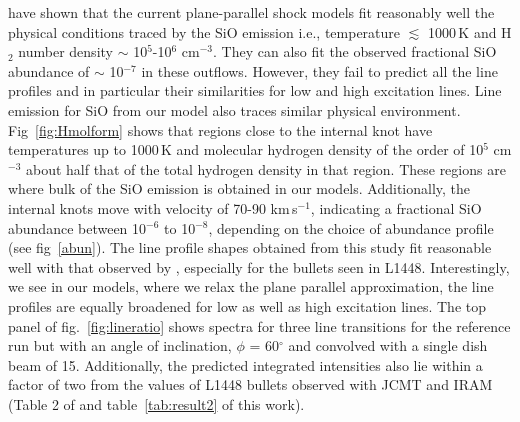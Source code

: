 \documentclass[useAMS,usenatbib,letters]{mn2e}
\begin{document}
\cite{Nisini:2007p13128} have shown that the current
plane-parallel shock models fit reasonably well the physical
conditions traced by the SiO emission i.e., temperature $\lesssim$
1000\,K and H$_{2}$ number density $\sim$ 10$^{5}$-10$^{6}$
cm$^{-3}$. They can also fit the observed fractional SiO abundance of
$\sim$ 10$^{-7}$ in these outflows. However, they fail to predict all
the line profiles and in particular their similarities for low and
high excitation lines. Line emission for SiO from our model also traces similar
physical environment. Fig~\ref{fig:Hmolform} shows that regions close
to the internal knot have temperatures up to 1000\,K and molecular
hydrogen density of the order of 10$^{5}$ cm$^{-3}$ about half that of the total
hydrogen density in that region. These regions are where bulk of the
SiO emission is obtained in our models. Additionally, the internal
knots move with velocity of 70-90 km\,s$^{-1}$, indicating a
fractional SiO abundance between 10$^{-6}$ to 10$^{-8}$, depending on the
choice of abundance profile (see fig~\ref{abun}). 
The line profile shapes obtained from this study fit reasonable well with that observed by
\cite{Nisini:2007p13128}, especially for the bullets seen in
L1448. Interestingly, we see in our models, where we relax the plane parallel
approximation, the line profiles are equally broadened for low as well
as high excitation lines. The top panel of fig.~\ref{fig:lineratio} shows spectra for three line
transitions for the reference run but with an angle of inclination,
$\phi$ = 60$^{\circ}$ and convolved with a single dish beam of
15\arcsec. Additionally, the predicted integrated
intensities also lie within a factor of two from the values of L1448 bullets
observed with JCMT and IRAM (Table 2 of \citealt{Nisini:2007p13128}  and
table~\ref{tab:result2} of this work).
%
\end{document}
